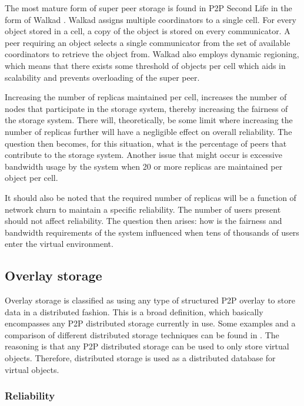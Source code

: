 The most mature form of super peer storage is found in P2P Second Life \cite{varvello_phd} in the form of Walkad \cite{Walkad_Varvello}. Walkad assigns multiple coordinators to a single cell. For every object stored in a cell, a copy of the object is stored on every communicator. A peer requiring an object selects a single communicator from the set of available coordinators to retrieve the object from. Walkad also employs dynamic regioning, which means that there exists some threshold of objects per cell which aids in scalability and prevents overloading of the super peer.

Increasing the number of replicas maintained per cell, increases the number of nodes that participate in the storage system, thereby increasing the fairness of the storage system. There will, theoretically, be some limit where increasing the number of replicas further will have a negligible effect on overall reliability. The question then becomes, for this situation, what is the percentage of peers that contribute to the storage system. Another issue that might occur is excessive bandwidth usage by the system when 20 or more replicas are maintained per object per cell.

It should also be noted that the required number of replicas will be a function of network churn to maintain a specific reliability. The number of users present should not affect reliability. The question then arises: how is the fairness and bandwidth requirements of the system influenced when tens of thousands of users enter the virtual environment.

\subsection{Overlay storage}
\label{overlay_storage}

Overlay storage is classified as using any type of structured P2P overlay to store data in a distributed fashion. This is a broad definition, which basically encompasses any P2P distributed storage currently in use. Some examples and a comparison of different distributed storage techniques can be found in \cite{Hasan_distributed_storage_survey}. The reasoning is that any P2P distributed storage can be used to only store virtual objects. Therefore, distributed storage is used as a distributed database for virtual objects.

\subsubsection{Reliability}
\label{overlay_storage_reliability}

